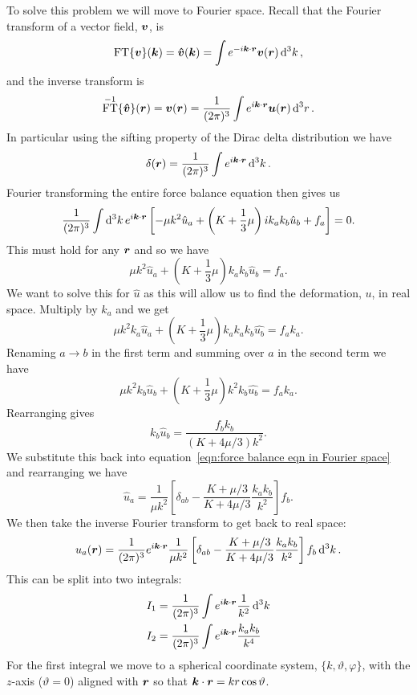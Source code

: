 \documentclass[a4paper]{article}
\DeclareMathOperator{\FT}{FT}
\begin{document}
    To solve this problem we will move to Fourier space.
    Recall that the Fourier transform of a vector field, \(\bm{v}\), is
    \[\FT\{\vv{v}\}(\vv{k}) = \vv{\hat{v}}(\vv{k}) = \int e^{-i\vv{k}\cdot\vv{r}}\vv{v}(\vv{r}) \dd[3]{k},\]
    and the inverse transform is
    \[\FT^{-1}\{\vv{\hat{v}}\}(\vv{r}) = \vv{v}(\vv{r}) = \frac{1}{(2\pi)^3}\int e^{i\vv{k}\cdot\vv{r}}\vv{u}(\vv{r})\dd[3]{r}.\]
    In particular using the sifting property of the Dirac delta distribution we have
    \[\delta(\bm{r}) = \frac{1}{(2\pi)^3}\int e^{i\bm{k}\cdot\bm{r}}\dd[3]{k}.\]
    Fourier transforming the entire force balance equation then gives us
    \[\frac{1}{(2\pi)^3} \int \dd[3]{k} e^{i\bm{k}\cdot\bm{r}} \left[ -\mu k^2\hat{u}_a + \left( K + \frac{1}{3}\mu \right)ik_ak_b\hat{u}_b + f_a \right] = 0.\]
    This must hold for any \(\bm{r}\) and so we have
    \begin{equation}\label{eqn:force balance eqn in Fourier space}
        \mu k^2\hat{u}_a + \left( K + \frac{1}{3}\mu \right)k_ak_b\hat{u}_b = f_a.
    \end{equation}
    We want to solve this for \(\hat{u}\) as this will allow us to find the deformation, \(u\), in real space.
    Multiply by \(k_a\) and we get
    \[\mu k^2k_a\hat{u}_a + \left( K + \frac{1}{3}\mu \right)k_ak_ak_b\hat{u_b} = f_ak_a.\]
    Renaming \(a\to b\) in the first term and summing over \(a\) in the second term we have
    \[\mu k^2k_b\hat{u}_b + \left( K + \frac{1}{3}\mu \right)k^2k_b\hat{u_b} = f_ak_a.\]
    Rearranging gives
    \[k_b\hat{u}_b = \frac{f_bk_b}{(K + 4\mu/3)k^2}.\]
    We substitute this back into equation~\ref{eqn:force balance eqn in Fourier space} and rearranging we have
    \[\hat{u}_a = \frac{1}{\mu k^2}\left[ \delta_{ab} - \frac{K + \mu/3}{K + 4\mu/3} \frac{k_ak_b}{k^2} \right]f_b.\]
    We then take the inverse Fourier transform to get back to real space:
    \[u_a(\bm{r}) = \frac{1}{(2\pi)^3}e^{i\bm{k}\cdot\bm{r}}\frac{1}{\mu k^2}\left[ \delta_{ab} - \frac{K+\mu/3}{K + 4\mu/3} \frac{k_ak_b}{k^2} \right]f_b\dd[3]{k}.\]
    This can be split into two integrals:
    \begin{align*}
        I_1 &= \frac{1}{(2\pi)^3}\int e^{i\bm{k}\cdot\bm{r}} \frac{1}{k^2} \dd[3]{k}\\
        I_2 &= \frac{1}{(2\pi)^3}\int e^{i\bm{k}\cdot\bm{r}} \frac{k_ak_b}{k^4}
    \end{align*}
    For the first integral we move to a spherical coordinate system, \(\{k, \vartheta, \varphi\}\), with the \(z\)-axis (\(\vartheta = 0\)) aligned with \(\bm{r}\) so that \(\bm{k}\cdot\bm{r} = kr\cos\vartheta\).
\end{document}
